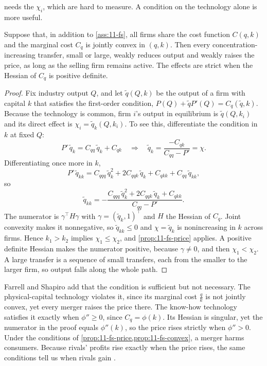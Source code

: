  needs the $\chi_i$, which are hard to measure. A condition on the technology alone is more
useful.

\begin{proposition}\label{prop:11-fs-convex}
Suppose that, in addition to \cref{ass:11-fs}, all firms share the cost function $C(q, k)$ and the marginal cost
$C_q$ is jointly convex in $(q, k)$. Then every concentration-increasing transfer, small or large, weakly reduces
output and weakly raises the price, as long as the selling firm remains active. The effects are strict when the Hessian
of $C_q$ is positive definite.
\end{proposition}

\begin{proof}
Fix industry output $Q$, and let $\tilde q(Q, k)$ be the output of a firm with capital $k$ that satisfies the
first-order condition, $P(Q) + \tilde q P'(Q) = C_q(\tilde q, k)$. Because the technology is common, firm $i$'s output in
equilibrium is $\tilde q(Q, k_i)$ and its direct effect is $\chi_i = \tilde q_k(Q, k_i)$. To see this, differentiate the
condition in $k$ at fixed $Q$:
\begin{equation*}
P'\,\tilde q_k = C_{qq}\,\tilde q_k + C_{qk}
\quad\Longrightarrow\quad
\tilde q_k = \frac{-C_{qk}}{C_{qq} - P'} = \chi .
\end{equation*}
Differentiating once more in $k$,
\begin{equation*}
P'\,\tilde q_{kk} = C_{qqq}\,\tilde q_k^2 + 2C_{qqk}\,\tilde q_k + C_{qkk} + C_{qq}\,\tilde q_{kk},
\end{equation*}
so
\begin{equation*}
\tilde q_{kk} = -\frac{C_{qqq}\,\tilde q_k^2 + 2C_{qqk}\,\tilde q_k + C_{qkk}}{C_{qq} - P'} .
\end{equation*}
The numerator is $\gamma^\top H\gamma$ with $\gamma = (\tilde q_k, 1)^\top$ and $H$ the Hessian of $C_q$. Joint
convexity makes it nonnegative, so $\tilde q_{kk} \le 0$ and $\chi = \tilde q_k$ is nonincreasing in $k$ across firms.
Hence $k_1 > k_2$ implies $\chi_1 \le \chi_2$, and \cref{prop:11-fs-price} applies. A positive definite Hessian
makes the numerator positive, because $\gamma \ne 0$, and then $\chi_1 < \chi_2$. A large transfer is a sequence of small transfers, each from the smaller to the larger firm,
so output falls along the whole path.
\end{proof}

Farrell and Shapiro add that the condition is sufficient but not necessary. The physical-capital technology
violates it, since its marginal cost $\frac{q}{k}$ is not jointly convex, yet every merger raises the price there.
The know-how technology satisfies it exactly when $\phi'' \ge 0$, since $C_q = \phi(k)$. Its Hessian is
singular, yet the numerator in the proof equals $\phi''(k)$, so the price rises strictly when $\phi'' > 0$. Under the conditions of
\cref{prop:11-fs-price,prop:11-fs-convex}, a merger harms consumers. Because rivals' profits rise exactly when the
price rises, the same conditions tell us when rivals gain \citep[p.~15]{FarrellShapiro1988}.


